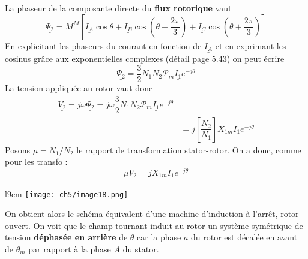 		La phaseur de la composante directe du \textbf{flux rotorique} vaut 
		\begin{equation}
		\underline{\Psi_2}=M^M[\underline{I_A}\cos\theta + \underline{I_B}
		\cos(\theta-\frac{2\pi}{3}) + \underline{I_C}\cos(\theta+\frac{2\pi}{3})]
		\end{equation}
		En explicitant les phaseurs du courant en fonction de $\underline{I_A}$ 
		et en exprimant les cosinus grâce aux exponentielles complexes (détail 
		page 5.43) on peut écrire
		\begin{equation}
		\underline{\Psi_2} = \dfrac{3}{2}N_1N_2\mathcal{P}_m\underline{I_1}e^{-j
		\theta}
		\end{equation}
		La tension appliquée au rotor vaut donc
		\begin{equation}
		\begin{array}{ll}
		\underline{V_2} = j\omega\underline{\Psi_2} = j\omega\dfrac{3}{2}N_1N_2
		\mathcal{P}_m\underline{I_1}e^{-j\theta}\\
		&= j\left[\dfrac{N_2}{N_1}\right]X_{1m}\underline{I_1}e^{-j\theta}
		\end{array}
		\end{equation}
		Posons $\mu = N_1/N_2$ le rapport de transformation stator-rotor. On a 
		donc, comme pour les transfo :
		\begin{equation}
		\mu\underline{V_2} = jX_{1m}\underline{I_1}e^{-j\theta}
		\end{equation}
		\newpage
		\begin{wrapfigure}[10]{l}{9cm}
		\vspace{-8mm}
		\texttt{[image: ch5/image18.png]}
		\end{wrapfigure}
		On obtient alors le schéma équivalent d'une machine d'induction à l'arrêt, 
		rotor ouvert. On voit que le champ tournant induit au rotor un système 
		symétrique de tension \textbf{déphasée en arrière} de $\theta$ car la phase 
		$a$ du rotor est décalée en avant de $\theta_m$ par rapport à la phase $A$ 
		du stator.\\
		
		
		
